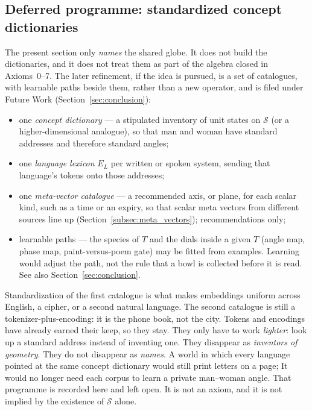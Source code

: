 \documentclass[12pt, a4paper]{article}
\begin{document}
\subsection{Deferred programme: standardized concept dictionaries}
\label{subsec:standard_dictionaries}
The present section only \emph{names} the shared globe. It does not
build the dictionaries, and it does not treat them as part of the
algebra closed in Axioms~0--7. The later refinement, if the idea is
pursued, is a set of catalogues, with learnable paths beside them, rather than a new operator, and is
filed under Future Work (Section~\ref{sec:conclusion}):
\begin{itemize}
    \item one \emph{concept dictionary} --- a stipulated inventory of
          unit states on $\mathcal{S}$ (or a higher-dimensional
          analogue), so that $\mathrm{man}$ and $\mathrm{woman}$ have
          standard addresses and therefore standard angles;
    \item one \emph{language lexicon} $E_L$ per written or spoken
          system, sending that language's tokens onto those addresses;
    \item one \emph{meta-vector catalogue} --- a recommended axis, or plane,
          for each scalar kind, such as a time or an expiry, so that
          scalar meta vectors from different sources line up
          (Section~\ref{subsec:meta_vectors}); recommendations only;
    \item learnable paths --- the species of $T$ and the dials inside
          a given $T$ (angle map, phase map, paint-versus-poem gate)
          may be fitted from examples. Learning would adjust the path,
          not the rule that a bowl is collected before it is read.
          See also Section~\ref{sec:conclusion}.
\end{itemize}
Standardization of the first catalogue is what makes embeddings
uniform across English, a cipher, or a second natural language.
The second catalogue is still a tokenizer-plus-encoding: it is the
phone book, not the city. Tokens and encodings have already earned
their keep, so they stay. They only have to work \emph{lighter}:
look up a standard address instead of inventing one. They disappear as
\emph{inventors of geometry}. They do not disappear as \emph{names}.
A world in which every language pointed at the same concept
dictionary would still print letters on a page; It would no longer need each 
corpus to learn a private $\mathrm{man}$--$\mathrm{woman}$ angle. 
That programme is recorded here and left open. It is not an
axiom, and it is not implied by the existence of $\mathcal{S}$ alone.
\end{document}
